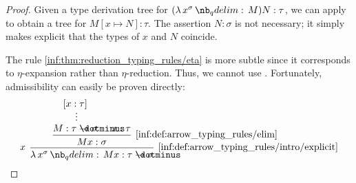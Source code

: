 \begin{proof}
  Given a type derivation tree for \( (\qabs {x^\sigma} M) N: \tau \), we can apply  to obtain a tree for \( M[x \mapsto N]: \tau \). The assertion \( N: \sigma \) is not necessary; it simply makes explicit that the types of \( x \) and \( N \) coincide.

  The rule \ref{inf:thm:reduction_typing_rules/eta} is more subtle since it corresponds to \( \eta \)-expansion rather than \( \eta \)-reduction. Thus, we cannot use . Fortunately, admissibility can easily be proven directly:
  \begin{equation*}
    \begin{prooftree}
      \hypo{ [x: \tau] }
      \ellipsis {} { M: \tau \synimplies \sigma }

      \hypo{ x: \tau }

      \infer2[\ref{inf:def:arrow_typing_rules/elim}]{ Mx: \sigma }

      \infer[left label=\( x \)]1[\ref{inf:def:arrow_typing_rules/intro/explicit}]{ \qabs {x^\sigma} Mx: \tau \synimplies \sigma }
    \end{prooftree}
  \end{equation*}
\end{proof}

